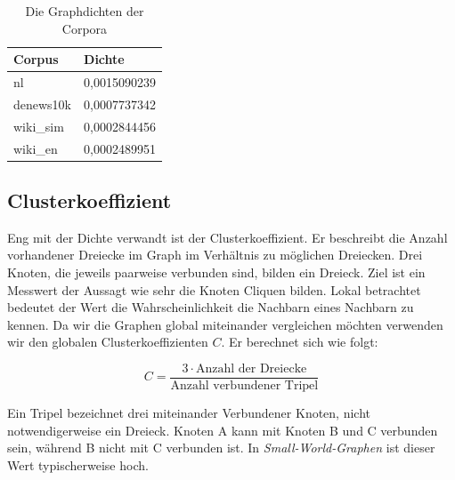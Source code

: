 \documentclass[11pt, a4paper]{article}
\begin{document}
\begin{table}[h]
  \centering
  \begin{tabular}{ll}
    \toprule
    Corpus            & Dichte          \\
    \midrule
    nl                &  		0,0015090239 \\
    denews10k         &  		0,0007737342 \\
    wiki\_sim         &  		0,0002844456 \\
    wiki\_en          &  		0,0002489951 \\
    \bottomrule
  \end{tabular}
  \caption{\label{density_table} Die Graphdichten der Corpora}
\end{table}

\subsection{Clusterkoeffizient}

Eng mit der Dichte verwandt ist der Clusterkoeffizient. Er beschreibt die
Anzahl vorhandener Dreiecke im Graph im Verhältnis zu möglichen Dreiecken. Drei
Knoten, die jeweils paarweise verbunden sind, bilden ein Dreieck. Ziel ist ein
Messwert der Aussagt wie sehr die Knoten Cliquen bilden. Lokal betrachtet
bedeutet der Wert die Wahrscheinlichkeit die Nachbarn eines Nachbarn zu kennen.
Da wir die Graphen global miteinander vergleichen möchten verwenden wir den
globalen Clusterkoeffizienten $C$. Er berechnet sich wie folgt:

$$
    C = \frac{3\cdot\text{Anzahl der Dreiecke}}{\text{Anzahl verbundener Tripel}}
$$

Ein Tripel bezeichnet drei miteinander Verbundener Knoten, nicht
notwendigerweise ein Dreieck. Knoten A kann mit Knoten B und C verbunden sein,
während B nicht mit C verbunden ist. In \emph{Small-World-Graphen} ist dieser
Wert typischerweise hoch. 



\end{document}
